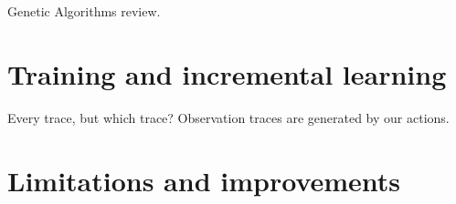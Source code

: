 
Genetic Algorithms review\cite{bib:ga-mutations-review}.

\section{Training and incremental learning}

Every trace, but which trace? Observation traces are generated by our actions.



\section{Limitations and improvements}

\label{sec:fluents-limitations}

